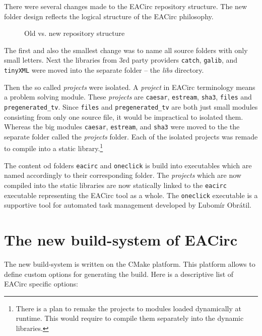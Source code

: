 \documentclass[12pt,oneside]{fithesis2}
\begin{document}
There were several changes made to the EACirc repository structure. The new folder design reflects the logical structure of the EACirc philosophy.

	\begin{figure}[H]
	\centering
	
	\caption{Old vs. new repository structure}
	\end{figure}
	
\noindent
The first and also the smallest change was to name all source folders with only small letters. Next the libraries from 3rd party providers \texttt{catch}, \texttt{galib}, and \texttt{tinyXML} were moved into the separate folder -- the \emph{libs} directory.

Then the so called \emph{projects} were isolated. A \emph{project} in EACirc terminology means a problem solving module. These \emph{projects} are \texttt{caesar}, \texttt{estream}, \texttt{sha3}, \texttt{files} and \texttt{pregenerated\_tv}. Since \texttt{files} and \texttt{pregenerated\_tv} are both just small modules consisting from only one source file, it would be impractical to isolated them. Whereas the big modules \texttt{caesar}, \texttt{estream}, and \texttt{sha3} were moved to the the separate folder called the \emph{projects} folder. Each of the isolated projects was remade to compile into a static library.\footnote{There is a plan to remake the projects to modules loaded dynamically at runtime. This would require to compile them separately into the dynamic libraries.}

The content od folders \texttt{eacirc} and \texttt{oneclick} is build into executables which are named accordingly to their corresponding folder. The \emph{projects} which are now compiled into the static libraries are now statically linked to the \texttt{eacirc} executable representing the EACirc tool as a whole. The \texttt{oneclick} executable is a supportive tool for automated task management developed by Ľubomír Obrátil. \cite{oneclick}

\section{The new build-system of EACirc}

The new build-system is written on the CMake platform. This platform allows to define custom options for generating the build. Here is a descriptive list of EACirc specific options:
\end{document}
